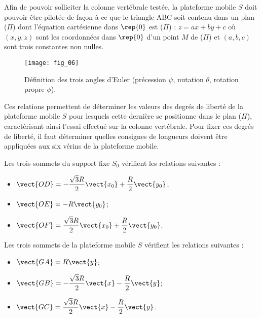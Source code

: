 Afin de pouvoir solliciter la colonne vertébrale testée, la plateforme mobile $S$ doit pouvoir être pilotée de façon à
ce que le triangle ABC soit contenu dans un plan ($\Pi$) dont l’équation cartésienne dans $\rep{0}$ est ($\Pi$) : $z=ax+by+c$
où $\left(x,y,z\right)$ sont les coordonnées dans $\rep{0}$ d’un point $M$ de ($\Pi$) et $(a,b,c)$ sont trois constantes non nulles.

\begin{figure}[H]
\centering
\texttt{[image: fig\_06]}
\caption{\label{fig:06} Définition des trois angles d’Euler (précession $\psi$, nutation $\theta$, rotation propre $\phi$).}
\end{figure}


\ifprof
\begin{corrige}
\end{corrige}
\else
\fi


Ces relations permettent de déterminer les valeurs des degrés de liberté de la plateforme mobile $S$ pour lesquels
cette dernière se positionne dans le plan ($\Pi$), caractérisant ainsi l’essai effectué sur la colonne vertébrale. Pour
fixer ces degrés de liberté, il faut déterminer quelles consignes de longueurs doivent être appliquées aux six
vérins de la plateforme mobile.

\begin{multicols}{2}
Les trois sommets du support fixe $S_0$ vérifient les relations suivantes :
\begin{itemize}
\item $\vect{OD}=-\dfrac{\sqrt{3}R}{2}\vect{x_0}+\dfrac{R}{2}\vect{y_0}$;
\item $\vect{OE}=-R\vect{y_0}$;
\item $\vect{OF}=\dfrac{\sqrt{3}R}{2}\vect{x_0}+\dfrac{R}{2}\vect{y_0}$.
\end{itemize}

Les trois sommets de la plateforme mobile $S$ vérifient les relations suivantes :
\begin{itemize}
\item $\vect{GA}=R\vect{y}$;
\item $\vect{GB}=-\dfrac{\sqrt{3}R}{2}\vect{x}-\dfrac{R}{2}\vect{y}$;
\item $\vect{GC}=\dfrac{\sqrt{3}R}{2}\vect{x}-\dfrac{R}{2}\vect{y}$.
\end{itemize}
\end{multicols}

